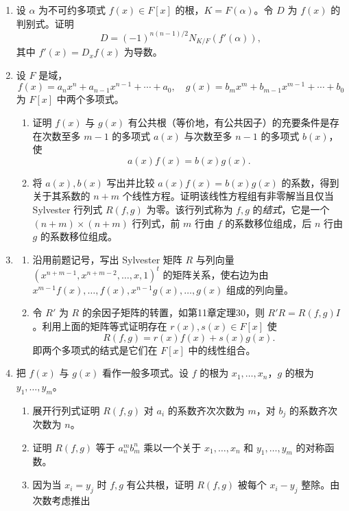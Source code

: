 \begin{enumerate}[label=\arabic*.]
\begin{enumerate}[label=(\alph*)]
\[\begin{pmatrix}
			\vdots&\vdots&\vdots&&\vdots\\
			p_{n-1}&p_n&p_{n+1}&\cdots&p_{2n-2}
		\end{pmatrix},
		\]
		其中 $p_i=\alpha_1^i+\cdots+\alpha_n^i$，它可由 Newton 公式用 $f(x)$ 的系数计算。这给出计算判别式的有效方法。
	\end{enumerate}
	\item 设 $\alpha$ 为不可约多项式 $f(x)\in F[x]$ 的根，$K=F(\alpha)$。令 $D$ 为 $f(x)$ 的判别式。证明
	\[
	D=(-1)^{n(n-1)/2}N_{K/F}(f'(\alpha)),
	\]
	其中 $f'(x)=D_xf(x)$ 为导数。
	\item 设 $F$ 是域，
	\[
	f(x)=a_nx^n+a_{n-1}x^{n-1}+\cdots+a_0,
	\quad
	g(x)=b_mx^m+b_{m-1}x^{m-1}+\cdots+b_0
	\]
	为 $F[x]$ 中两个多项式。
	\begin{enumerate}[label=(\alph*)]
		\item 证明 $f(x)$ 与 $g(x)$ 有公共根（等价地，有公共因子）的充要条件是存在次数至多 $m-1$ 的多项式 $a(x)$ 与次数至多 $n-1$ 的多项式 $b(x)$，使
		\[
		a(x)f(x)=b(x)g(x).
		\]
		\item 将 $a(x),b(x)$ 写出并比较 $a(x)f(x)=b(x)g(x)$ 的系数，得到关于其系数的 $n+m$ 个线性方程。证明该线性方程组有非零解当且仅当 Sylvester 行列式 $R(f,g)$ 为零。该行列式称为 $f,g$ 的\emph{结式}，它是一个 $(n+m)\times(n+m)$ 行列式，前 $m$ 行由 $f$ 的系数移位组成，后 $n$ 行由 $g$ 的系数移位组成。
	\end{enumerate}
	\item 
	\begin{enumerate}[label=(\alph*)]
		\item 沿用前题记号，写出 Sylvester 矩阵 $R$ 与列向量 $(x^{n+m-1},x^{n+m-2},\ldots,x,1)^t$ 的矩阵关系，使右边为由 $x^{m-1}f(x),\ldots,f(x),x^{n-1}g(x),\ldots,g(x)$ 组成的列向量。
		\item 令 $R'$ 为 $R$ 的余因子矩阵的转置，如第11章定理30，则 $R'R=R(f,g)I$。利用上面的矩阵等式证明存在 $r(x),s(x)\in F[x]$ 使
		\[
		R(f,g)=r(x)f(x)+s(x)g(x).
		\]
		即两个多项式的结式是它们在 $F[x]$ 中的线性组合。
	\end{enumerate}
	\item 把 $f(x)$ 与 $g(x)$ 看作一般多项式。设 $f$ 的根为 $x_1,
	\ldots,x_n$，$g$ 的根为 $y_1,
	\ldots,y_m$。
	\begin{enumerate}[label=(\alph*)]
		\item 展开行列式证明 $R(f,g)$ 对 $a_i$ 的系数齐次次数为 $m$，对 $b_j$ 的系数齐次次数为 $n$。
		\item 证明 $R(f,g)$ 等于 $a_n^m b_m^n$ 乘以一个关于 $x_1,
		\ldots,x_n$ 和 $y_1,
		\ldots,y_m$ 的对称函数。
		\item 因为当 $x_i=y_j$ 时 $f,g$ 有公共根，证明 $R(f,g)$ 被每个 $x_i-y_j$ 整除。由次数考虑推出

\end{enumerate}
\end{enumerate}
